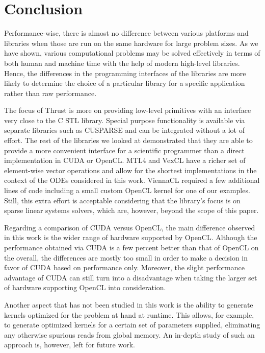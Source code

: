 \documentclass[final]{siamltex}
\newcommand{\addpp}[1]{{#1\nolinebreak[4]\hspace{-.05em}\raisebox{.4ex}{\tiny\bf ++}}\xspace}
\newcommand{\Cpp}{\addpp{C}}
\begin{document}
%
%
\section{Conclusion}

Performance-wise, there is almost no difference between various platforms and
libraries when those are run on the same hardware for large problem sizes.
As we have shown, various
computational problems may be solved effectively in terms of both human and
machine time with the help of modern high-level libraries. Hence, the
differences in the programming interfaces of the libraries are more likely to
determine the choice of a particular library for a specific application rather than raw performance.

The focus of Thrust is more on providing low-level primitives with an
interface very close to the \Cpp STL library.  Special purpose
functionality is available via separate libraries such as CUSPARSE and
can be integrated without a lot of effort.  The rest of the libraries
we looked at demonstrated that they are able to provide a more
convenient interface for a scientific programmer than a direct
implementation in CUDA or OpenCL.  MTL4 and VexCL have a richer set of
element-wise vector operations and allow for the shortest
implementations in the context of the ODEs considered in this work.
ViennaCL required a few additional lines of code including a small
custom OpenCL kernel for one of our examples.  Still, this extra
effort is acceptable considering that the library's focus is on sparse
linear systems solvers, which are, however, beyond the scope of this
paper.

Regarding a comparison of CUDA versus OpenCL, the main difference observed in
this work is the wider range of hardware supported by OpenCL.  Although the performance
obtained via CUDA is a few percent better than that of OpenCL on the overall,
the differences are mostly too small in order to make a decision in favor of
CUDA based on performance only.  Moreover, the slight performance advantage of
CUDA can still turn into a disadvantage when taking the larger set of hardware
supporting OpenCL into consideration.


Another aspect that has not been studied in this work is the ability to
generate kernels optimized for the problem at hand at runtime. This allows, for
example, to generate optimized kernels for a certain set of parameters
supplied, eliminating any otherwise spurious reads from global memory.  An
in-depth study of such an approach is, however, left for future work.
\end{document}
